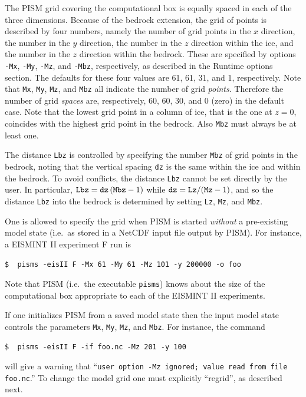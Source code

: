 \documentclass[11pt,final]{amsart}
\renewcommand{\t}[1]{\texttt{#1}}
\begin{document}
The PISM grid covering the computational box is equally spaced in each of the three dimensions.  Because of the bedrock extension, the grid of points is described by four numbers, namely the number of grid points in the $x$ direction, the number in the $y$ direction, the number in the $z$ direction within the ice, and the number in the $z$ direction within the bedrock.  These are specified by options \verb|-Mx|, \verb|-My|, \verb|-Mz|, and \verb|-Mbz|, respectively, as described in the Runtime options section.  The defaults for these four values are 61, 61, 31, and 1, respectively.  Note that \verb|Mx|, \verb|My|, \verb|Mz|, and \verb|Mbz| all indicate the number of grid \emph{points}.  Therefore the number of grid \emph{spaces} are, respectively, 60, 60, 30, and 0 (zero) in the default case.  Note that the lowest grid point in a column of ice, that is the one at $z=0$, coincides with the highest grid point in the bedrock.  Also \verb|Mbz| must always be at least one.

The distance \t{Lbz} is controlled by specifying the number \verb|Mbz| of grid points in the bedrock, noting that the vertical spacing \t{dz} is the same within the ice and within the bedrock.  To avoid conflicts, the distance \t{Lbz} cannot be set directly by the user.  In particular, $\text{\t{Lbz}}=\text{\t{dz}}\,(\text{\t{Mbz}}-1)$ while $\text{\t{dz}} = \text{\t{Lz}} / (\text{\t{Mz}}-1)$, and so the distance \t{Lbz} into the bedrock is determined by setting \t{Lz}, \t{Mz}, and \t{Mbz}.

One is allowed to specify the grid when PISM is started \emph{without} a pre-existing model state (i.e.~as stored in a NetCDF input file output by PISM).  For instance, a EISMINT II experiment F \cite{EISMINT00} run is

\verb|$  pisms -eisII F -Mx 61 -My 61 -Mz 101 -y 200000 -o foo|

\noindent Note that PISM (i.e.~the executable \verb|pisms|) knows about the size of the computational box appropriate to each of the EISMINT II experiments.

If one initializes PISM from a saved model state then the input model state controls the parameters \t{Mx}, \t{My}, \t{Mz}, and \t{Mbz}.  For instance, the command

\verb|$  pisms -eisII F -if foo.nc -Mz 201 -y 100|

\noindent will give a warning that ``\verb|user option -Mz ignored; value read from file foo.nc|.''  To change the model grid one must explicitly ``regrid'', as described next.
\end{document}
